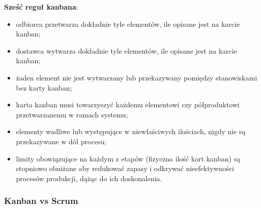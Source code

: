 \documentclass[a4paper]{article}
\begin{document}
    \textbf{Sześć reguł kanbana}:
    \begin{itemize}
        \item odbiorca przetwarza dokładnie tyle elementów, ile opisane
        jest na karcie kanban;
        \item dostawca wytwarza dokładnie tyle elementów, ile opisane jest
        na karcie kanban;
        \item żaden element nie jest wytwarzany lub przekazywany
        pomiędzy stanowiskami bez karty kanban;
        \item karta kanban musi towarzyszyć każdemu elementowi czy
        półproduktowi przetwarzanemu w ramach systemu;
        \item elementy wadliwe lub występujące w niewłaściwych ilościach,
        nigdy nie są przekazywane w dół procesu;
        \item limity obowiązujące na każdym z etapów (fizyczna ilość kart
        kanban) są stopniowo obniżane aby redukować zapasy i
        odkrywać nieefektywności procesów produkcji, dążąc do ich
        doskonalenia.
    \end{itemize}

    \subsubsection{Kanban vs Scrum}
\end{document}
